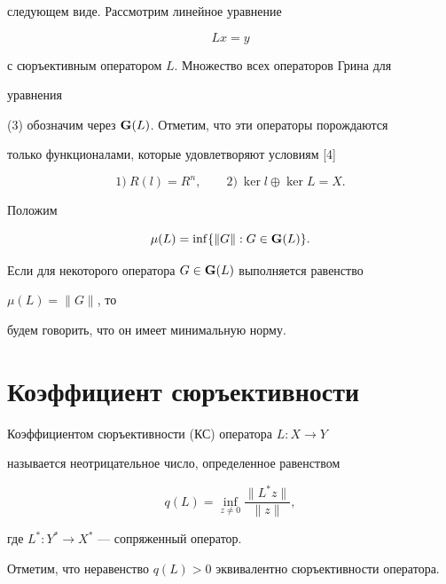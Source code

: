 следующем виде. Рассмотрим линейное уравнение 


\begin{equation} 


L x=y 


\end{equation} 


с сюръективным оператором $L$. Множество всех операторов Грина для 


уравнения  


(3) обозначим через $\bold G(L)$. Отметим, что эти операторы порождаются 


только функционалами, которые удовлетворяют условиям [4] 


$$ 


1) \ R(l)=R^n,\qquad 2) \ \ker l\oplus\ker L=X. 


$$ 


 


Положим 


$$ 


\mu(L)=\inf\{\|G\|:G\in\bold G(L)\}. 


$$ 


Если для некоторого оператора $G\in\bold G(L)$ выполняется равенство 


$\mu(L)=\|G\|$, то  


будем говорить, что он имеет минимальную норму. 


 


\section{Коэффициент сюръективности} 


 


\begin{defn} 


Коэффициентом сюръективности (КС) оператора $L:X\to Y$ 


называется неотрицательное число, определенное равенством 


$$ 


q(L)=\inf_{z\ne0}\frac{\|L^*z\|}{\|z\|}, 


$$ 


где $L^*:Y^*\to X^*$ --- сопряженный оператор.  


Отметим, что неравенство $q(L)>0$ эквивалентно сюръективности оператора. 


\end{defn} 



